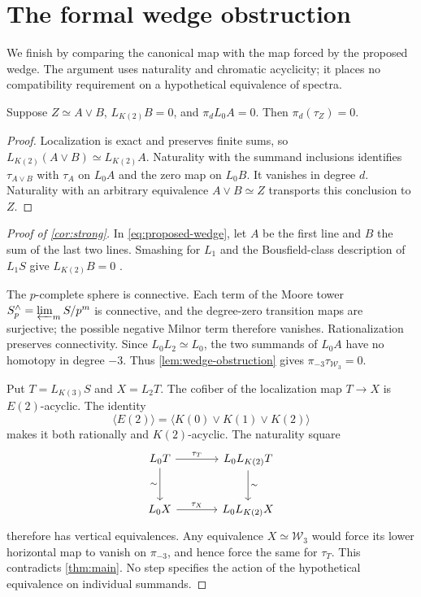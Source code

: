 \section{The formal wedge obstruction}
\label{sec:wedge-obstruction}

We finish by comparing the canonical map with the map forced by the
proposed wedge. The argument uses naturality and chromatic acyclicity;
it places no compatibility requirement on a hypothetical equivalence
of spectra.

\begin{lemma}\label{lem:wedge-obstruction}
Suppose \(Z\simeq A\vee B\), \(L_{K(2)}B=0\), and
\(\pi_dL_0A=0\). Then \(\pi_d(\tau_Z)=0\).
\end{lemma}

\begin{proof}
Localization is exact and preserves finite sums, so
\(L_{K(2)}(A\vee B)\simeq L_{K(2)}A\).
Naturality with the summand inclusions identifies
\(\tau_{A\vee B}\) with \(\tau_A\) on \(L_0A\) and the zero map on
\(L_0B\). It vanishes in degree \(d\). Naturality with an arbitrary
equivalence \(A\vee B\simeq Z\) transports this conclusion to \(Z\).
\end{proof}

\begin{proof}[Proof of \cref{cor:strong}]
In \eqref{eq:proposed-wedge}, let \(A\) be the first line and \(B\)
the sum of the last two lines. Smashing for \(L_1\) and the
Bousfield-class description of \(L_1S\) give \(L_{K(2)}B=0\)
\cite[Theorem~5.1 and Proposition~5.3]{HS1999}.

The \(p\)-complete sphere is connective. Each term of the Moore tower
\(S_p^\wedge=\varprojlim_m S/p^m\) is connective, and the degree-zero
transition maps are surjective; the possible negative Milnor term
therefore vanishes. Rationalization preserves connectivity. Since
\(L_0L_2\simeq L_0\), the two summands of \(L_0A\) have no homotopy
in degree \(-3\). Thus \cref{lem:wedge-obstruction} gives
\(\pi_{-3}\tau_{\mathcal W_3}=0\).

Put \(T=L_{K(3)}S\) and \(X=L_2T\). The cofiber of the localization
map \(T\to X\) is \(E(2)\)-acyclic. The identity
\[
 \langle E(2)\rangle
       =\langle K(0)\vee K(1)\vee K(2)\rangle
\]
makes it both rationally and \(K(2)\)-acyclic. The naturality square
\[
\begin{tikzcd}[column sep=large,row sep=large]
 L_0T\arrow[r,"\tau_T"]\arrow[d,"\sim"']
      &L_0L_{K(2)}T\arrow[d,"\sim"]\\
 L_0X\arrow[r,"\tau_X"]&L_0L_{K(2)}X
\end{tikzcd}
\]
therefore has vertical equivalences. Any equivalence
\(X\simeq\mathcal W_3\) would force its lower horizontal map to vanish
on \(\pi_{-3}\), and hence force the same for \(\tau_T\).
This contradicts \cref{thm:main}. No step specifies the action of
the hypothetical equivalence on individual summands.
\end{proof}
